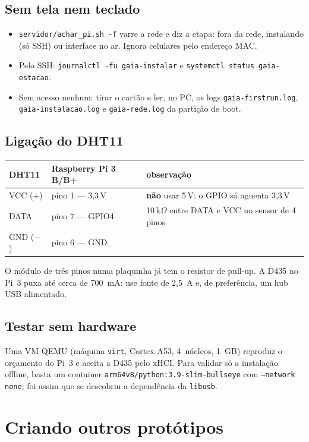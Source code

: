 \documentclass[11pt,a4paper]{article}
\newcommand{\cod}[1]{\texttt{#1}}
\begin{document}
\subsection{Sem tela nem teclado}
\begin{itemize}
  \item \cod{servidor/achar\_pi.sh -f} varre a rede e diz a etapa: fora da rede,
  instalando (só SSH) ou interface no ar. Ignora celulares pelo endereço MAC.
  \item Pelo SSH: \cod{journalctl -fu gaia-instalar} e \cod{systemctl status gaia-estacao}.
  \item Sem acesso nenhum: tirar o cartão e ler, no PC, os logs \cod{gaia-firstrun.log},
  \cod{gaia-instalacao.log} e \cod{gaia-rede.log} da partição de boot.
\end{itemize}

\subsection{Ligação do DHT11}
\begin{table}[h]
\centering\small
\begin{tabular}{@{}lll@{}}
\toprule
DHT11 & Raspberry Pi 3 B/B+ & observação \\
\midrule
VCC (+) & pino 1 --- 3,3\,V & \textbf{não} usar 5\,V: o GPIO só aguenta 3,3\,V \\
DATA & pino 7 --- GPIO4 & 10\,k$\Omega$ entre DATA e VCC no sensor de 4 pinos \\
GND ($-$) & pino 6 --- GND & \\
\bottomrule
\end{tabular}
\end{table}
O módulo de três pinos numa plaquinha já tem o resistor de pull-up. A D435 no Pi~3
puxa até cerca de 700~mA: use fonte de 2,5~A e, de preferência, um hub USB
alimentado.

\subsection{Testar sem hardware}
Uma VM QEMU (máquina \cod{virt}, Cortex-A53, 4~núcleos, 1~GB) reproduz o orçamento do
Pi~3 e aceita a D435 pelo xHCI. Para validar só a instalação offline, basta um
container \cod{arm64v8/python:3.9-slim-bullseye} com \cod{--network none}; foi assim
que se descobriu a dependência da \cod{libusb}.

\section{Criando outros protótipos}
\end{document}
